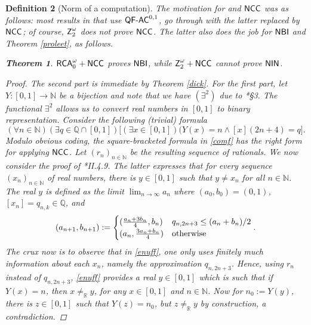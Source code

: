 \documentclass[reqno]{amsart}
\newtheorem{thm}{Theorem}
\newtheorem{defi}[thm]{Definition}
\newcommand\be{\begin{equation}}
\newcommand\ee{\end{equation}}
\def\Z{\textup{\textsf{Z}}}
\def\RCAo{\textup{\textsf{RCA}}_{0}^{\omega}}
\def\N{{\mathbb  N}}
\def\Q{{\mathbb  Q}}
\def\R{{\mathbb  R}}
\def\di{\rightarrow}
\def\QFAC{\textup{\textsf{QF-AC}}}
\def\NCC{\textup{\textsf{NCC}}}
\def\NBIJ{\textup{\textsf{NBI}}}
\def\NIN{\textup{\textsf{NIN}}}
\numberwithin{equation}{section}
\numberwithin{thm}{section}
\begin{document}
\begin{defi}[Norm of a computation]
\smallskip

The motivation for \cite{dagsamIX} and $\NCC$ was as follows: most results in \cites{dagsamIII, dagsamV, dagsamVI, dagsamVII, samph} that use $\QFAC^{0,1}$, 
go through with the latter replaced by $\NCC$; of course, $\Z_{2}^{\omega}$ does not prove $\NCC$.  The latter also does the job for $\NBIJ$ and Theorem \ref{proleet}, as follows.  
\begin{thm}\label{hungzo}
$\RCAo+\NCC$ proves $\NBIJ$, while $\Z_{2}^{\omega}+\NCC$ cannot prove $\NIN$.  
\end{thm}
\begin{proof}
The second part is immediate by Theorem \ref{dick}.
For the first part, let $Y:[0,1]\di \N$ be a bijection and note that we have $(\exists^{2})$ due to \cite{kohlenbach2}*{\S3}.  
The functional $\exists^{2}$ allows us to convert real numbers in $[0,1 ]$ to binary representation.  
Consider the following (trivial) formula
\be\label{comf}
(\forall n\in \N)(\exists q\in \Q\cap [0,1])\big[ (\exists x\in [0,1])(Y(x)=n \wedge [x](2n+4)=q   \big].
\ee
Modulo obvious coding, the square-bracketed formula in \eqref{comf} has the right form for applying $\NCC$.  
Let $(r_{n})_{n\in \N}$ be the resulting sequence of rationals.  
We now consider the proof of \cite{simpson2}*{II.4.9}.  The latter expresses that for every sequence $(x_{n})_{n\in \N}$ of real numbers, there is $y\in [0,1]$ such that $y\ne x_{n}$ for all $n\in \N$.
The real $y$ is defined as the limit $\lim_{n\di \infty}a_{n}$ where $(a_{0}, b_{0})=(0,1)$, $[x_{n}]=q_{n, k}\in \Q$, and
\be\label{enuff}\textstyle
(a_{n+1}, b_{n+1}):=
\begin{cases}
(\frac{a_{n}+3b_{n}}{4} , b_{n}) & q_{n, 2n+3} \leq (a_{n}+b_{n})/2 \\ 
(a_{n }, \frac{3a_{n}+b_{n}}{4}) & \textup{otherwise}
\end{cases}.
\ee
The crux now is to observe that in \eqref{enuff}, one only uses \emph{finitely much information} about each $x_{n}$, namely the approximation $q_{n, 2n+3}$.   
Hence, using $r_{n}$ instead of $q_{n, 2n+3}$, \eqref{enuff} provides a real $y\in [0,1]$ which is such that if $Y(x)=n$, then $x\ne_{\R} y$, for any $x\in [0,1]$ and $n\in \N$.  
Now for $n_{0}:= Y(y)$, there is $z\in [0,1]$ such that $Y(z)=n_{0}$, but $z\ne_{\R} y$ by construction, a contradiction. 

\end{proof}
\end{defi}
\end{document}
